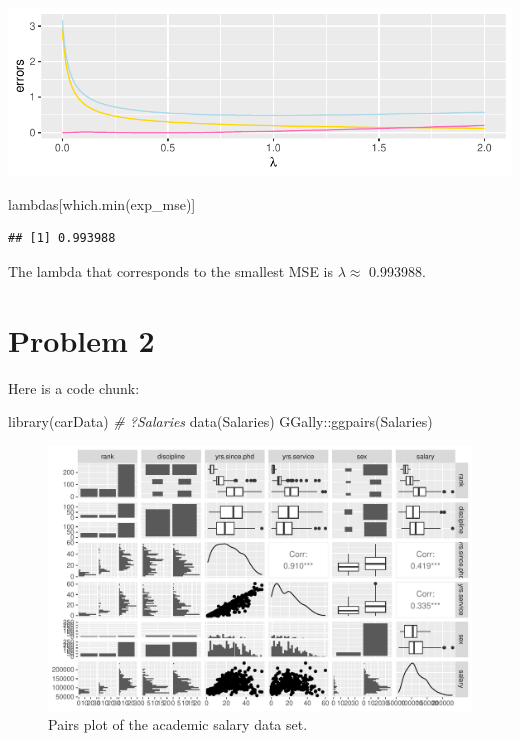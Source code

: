 \documentclass[
]{article}
\newenvironment{Shaded}{\begin{snugshade}}{\end{snugshade}}
\newcommand{\CommentTok}[1]{\textcolor[rgb]{0.56,0.35,0.01}{\textit{#1}}}
\newcommand{\FunctionTok}[1]{\textcolor[rgb]{0.00,0.00,0.00}{#1}}
\newcommand{\NormalTok}[1]{#1}
\newcommand{\SpecialCharTok}[1]{\textcolor[rgb]{0.00,0.00,0.00}{#1}}
\begin{document}
\begin{center}\includegraphics{Compulsory-1_files/figure-latex/unnamed-chunk-4-1} \end{center}

\begin{Shaded}
\begin{Highlighting}[]
\NormalTok{lambdas[}\FunctionTok{which.min}\NormalTok{(exp\_mse)]}
\end{Highlighting}
\end{Shaded}

\begin{verbatim}
## [1] 0.993988
\end{verbatim}

The lambda that corresponds to the smallest MSE is \(\lambda \approx\)
0.993988.

\hypertarget{problem-2}{%
\section{Problem 2}\label{problem-2}}

Here is a code chunk:

\begin{Shaded}
\begin{Highlighting}[]
\FunctionTok{library}\NormalTok{(carData)}
\CommentTok{\# ?Salaries}
\FunctionTok{data}\NormalTok{(Salaries)}
\NormalTok{GGally}\SpecialCharTok{::}\FunctionTok{ggpairs}\NormalTok{(Salaries)}
\end{Highlighting}
\end{Shaded}

\begin{figure}

{\centering \includegraphics{Compulsory-1_files/figure-latex/desc-1} 

}

\caption{Pairs plot of the academic salary data set.}\label{fig:desc}
\end{figure}
\end{document}
